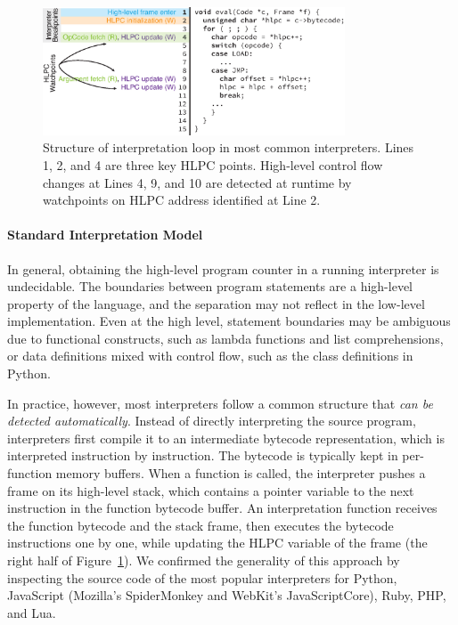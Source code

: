 \begin{figure}
  \centering
  \includegraphics[width=0.8\textwidth]{figures/chef/interp-model}
  \caption{Structure of interpretation loop in most common interpreters.  Lines 1, 2, and 4 are three key HLPC points.  High-level control flow changes at Lines 4, 9, and 10 are detected at runtime by watchpoints on HLPC address identified at Line 2.}
  \label{fig:chef:interp-model}
\end{figure}

\paragraph{Standard Interpretation Model}

In general, obtaining the high-level program counter in a running interpreter is undecidable.
%
The boundaries between program statements are a high-level property of the language, and the separation may not reflect in the low-level implementation.  Even at the high level, statement boundaries may be ambiguous due to functional constructs, such as lambda functions and list comprehensions, or data definitions mixed with control flow, such as the class definitions in Python.

In practice, however, most interpreters follow a common structure that \emph{can be detected automatically}.
%
Instead of directly interpreting the source program, interpreters first compile it to an intermediate bytecode representation, which is interpreted instruction by instruction.  The bytecode is typically kept in per-function memory buffers.
%
When a function is called, the interpreter pushes a frame on its high-level stack, which contains a pointer variable to the next instruction in the function bytecode buffer.
%
An interpretation function receives the function bytecode and the stack frame, then executes the bytecode instructions one by one, while updating the HLPC variable of the frame (the right half of Figure~\ref{fig:chef:interp-model}).
%
We confirmed the generality of this approach by inspecting the source code of the most popular interpreters for Python, JavaScript (Mozilla's SpiderMonkey and WebKit's JavaScriptCore), Ruby, PHP, and Lua.

